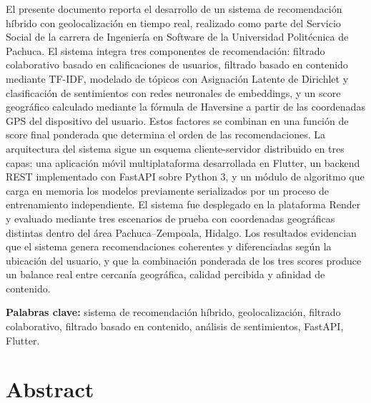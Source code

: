 \documentclass[11pt, letterpaper]{article}
\begin{document}
	El presente documento reporta el desarrollo de un sistema de recomendación
	híbrido con geolocalización en tiempo real, realizado como parte del
	Servicio Social de la carrera de Ingeniería en Software de la Universidad
	Politécnica de Pachuca. El sistema integra tres componentes de recomendación:
	filtrado colaborativo basado en calificaciones de usuarios, filtrado basado
	en contenido mediante TF-IDF, modelado de tópicos con Asignación Latente de
	Dirichlet y clasificación de sentimientos con redes neuronales de embeddings,
	y un score geográfico calculado mediante la fórmula de Haversine a partir de
	las coordenadas GPS del dispositivo del usuario. Estos factores se combinan
	en una función de score final ponderada que determina el orden de las
	recomendaciones. La arquitectura del sistema sigue un esquema cliente-servidor
	distribuido en tres capas: una aplicación móvil multiplataforma desarrollada
	en Flutter, un backend REST implementado con FastAPI sobre Python 3, y un
	módulo de algoritmo que carga en memoria los modelos previamente serializados
	por un proceso de entrenamiento independiente. El sistema fue desplegado en
	la plataforma Render y evaluado mediante tres escenarios de prueba con
	coordenadas geográficas distintas dentro del área Pachuca--Zempoala, Hidalgo.
	Los resultados evidencian que el sistema genera recomendaciones coherentes
	y diferenciadas según la ubicación del usuario, y que la combinación
	ponderada de los tres scores produce un balance real entre cercanía
	geográfica, calidad percibida y afinidad de contenido.
	
	\textbf{Palabras clave:} sistema de recomendación híbrido, geolocalización,
	filtrado colaborativo, filtrado basado en contenido, análisis de sentimientos,
	FastAPI, Flutter.
	
	\section*{Abstract}
	
\end{document}

